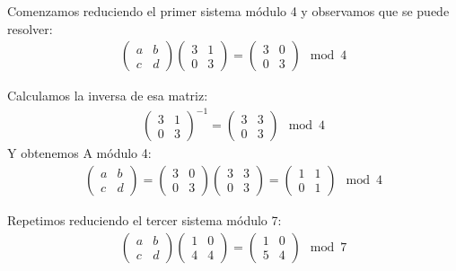 \begin{problem}[2]
Comenzamos reduciendo el primer sistema módulo 4 y observamos que se puede resolver:
\begin{align*}
\left( \begin{array}{cc}
  a & b \\
  c & d
  \end{array} \right)
\left( \begin{array}{cc}
  3 & 1 \\
  0 & 3
  \end{array} \right)
  =
  \left( \begin{array}{cc}
  3 & 0 \\
  0 & 3
  \end{array} \right) \mod 4
\end{align*}

Calculamos la inversa de esa matriz:
\begin{align*}
\left( \begin{array}{cc}
  3 & 1 \\
  0 & 3
  \end{array} \right)^{-1}
  =
  \left( \begin{array}{cc}
  3 & 3 \\
  0 & 3
  \end{array} \right) \mod 4
\end{align*}
Y obtenemos A módulo 4:
\begin{align*}
\left( \begin{array}{cc}
  a & b \\
  c & d
  \end{array} \right)
  =
  \left( \begin{array}{cc}
  3 & 0 \\
  0 & 3
  \end{array} \right)
  \left( \begin{array}{cc}
  3 & 3 \\
  0 & 3
  \end{array} \right) =
    \left( \begin{array}{cc}
  1 & 1 \\
  0 & 1
  \end{array} \right) \mod 4
\end{align*}

Repetimos reduciendo el tercer sistema módulo 7:
\begin{align*}
\left( \begin{array}{cc}
  a & b \\
  c & d
  \end{array} \right)
\left( \begin{array}{cc}
  1 & 0 \\
  4 & 4
  \end{array} \right)
  =
  \left( \begin{array}{cc}
  1 & 0 \\
  5 & 4
  \end{array} \right) \mod 7
\end{align*}


\end{problem}
